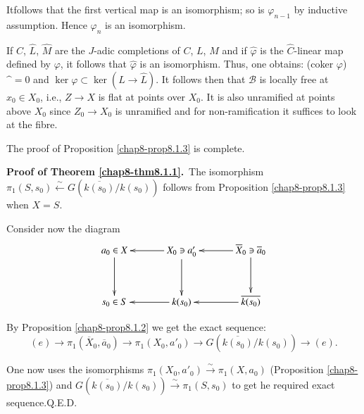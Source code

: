 It\pageoriginale follows that the first vertical map is an
isomorphism; so is $\varphi_{n-1}$ by inductive assumption. Hence
$\varphi_{n}$ is an isomorphism.

If $\widehat{C}$, $\widehat{L}$, $\widehat{M}$ are the $J$-adic
completions of $C$, $L$, $M$ and if $\widehat{\varphi}$ is the
$\widehat{C}$-linear map defined by $\varphi$, it follows that
$\widehat{\varphi}$ is an isomorphism. Thus, one obtains: (coker
$\varphi$)$\sphat=0$ and $\ker\varphi\subset \ker(L\to
\widehat{L})$. It follows then that $\mathscr{B}$ is locally free at
$x_{0}\in X_{0}$, i.e., $Z\to X$ is flat at points over $X_{0}$. It is
also unramified at points above $X_{0}$ since $Z_{0}\to X_{0}$ is
unramified and for non-ramification it suffices to look at the fibre.

The proof of Proposition \ref{chap8-prop8.1.3} is complete.

\medskip
\noindent
{\bf Proof of Theorem \ref{chap8-thm8.1.1}.}~The isomorphism
$\pi_{1}(S,s_{0})\xleftarrow{\sim}G(\overline{k(s_{0})}/k(s_{0}))$
follows from Proposition \ref{chap8-prop8.1.3} when $X=S$.

Consider now the diagram
\[
\xymatrix@=1.2cm{
a_{0}\in X\ar[d] & X_{0}\ni a'_{0}\ar[l]\ar[d] & \overline{X}_{0}\ni
\overline{a}_{0}\ar[l]\ar[d]\\
s_{0}\in S & k(s_{0})\ar[l] & \overline{k(s_{0})}\ar[l] 
}
\]

By Proposition \ref{chap8-prop8.1.2} we get the exact sequence:
$$
(e)\to \pi_{1}(\overline{X}_{0},\overline{a}_{0})\to
\pi_{1}(X_{0},a'_{0})\to G(\overline{k(s_{0})}/k(s_{0}))\to (e).
$$

One now uses the isomorphisms
$\pi_{1}(X_{0},a'_{0})\xrightarrow{\sim}\pi_{1}(X,a_{0})$ (Proposition
\ref{chap8-prop8.1.3}) and
$G(\overline{k(s_{0})}/k(s_{0}))\xrightarrow{\sim}\pi_{1}(S,s_{0})$ to
get he required exact sequence.\hfill Q.E.D.
